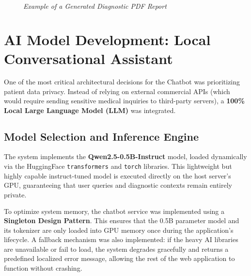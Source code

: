 \begin{figure}[H]
	\centering
	\caption{\textit{Example of a Generated Diagnostic PDF Report}}
	\label{fig:ui_pdf}
\end{figure}

\section{AI Model Development: Local Conversational Assistant}
One of the most critical architectural decisions for the Chatbot was prioritizing patient data privacy. Instead of relying on external commercial APIs (which would require sending sensitive medical inquiries to third-party servers), a \textbf{100\% Local Large Language Model (LLM)} was integrated.

\subsection{Model Selection and Inference Engine}
The system implements the \textbf{Qwen2.5-0.5B-Instruct} model, loaded dynamically via the HuggingFace \texttt{transformers} and \texttt{torch} libraries. This lightweight but highly capable instruct-tuned model is executed directly on the host server's GPU, guaranteeing that user queries and diagnostic contexts remain entirely private.

To optimize system memory, the chatbot service was implemented using a \textbf{Singleton Design Pattern}. This ensures that the 0.5B parameter model and its tokenizer are only loaded into GPU memory once during the application's lifecycle. A fallback mechanism was also implemented: if the heavy AI libraries are unavailable or fail to load, the system degrades gracefully and returns a predefined localized error message, allowing the rest of the web application to function without crashing.

